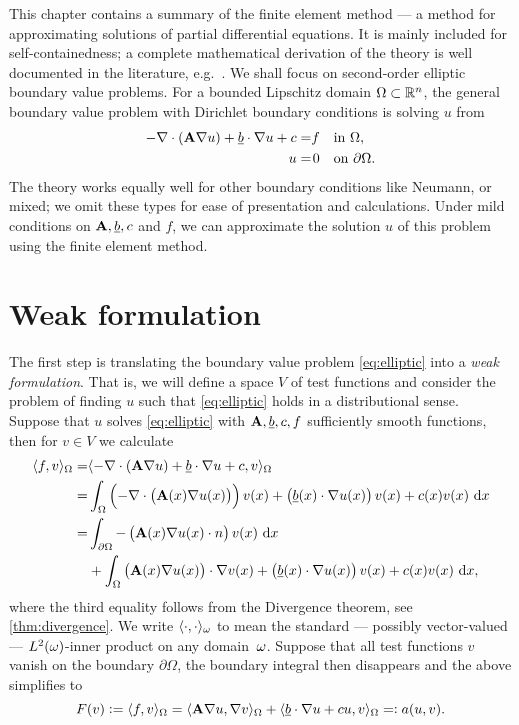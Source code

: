 \documentclass[thesis.tex]{subfiles}
\begin{document}
This chapter contains a summary of the finite element method ---
a method for approximating solutions of partial differential equations.
It is mainly included for self-containedness;
a complete mathematical derivation of the theory is well documented in the literature, e.g.~\cite{brenner, zienkiewicz1977finite}.
We shall focus on second-order elliptic boundary value problems. For a bounded Lipschitz domain $\Omega \subset \mathbb{R}^n$, the 
general boundary value problem with Dirichlet boundary conditions is solving $u$ from
\begin{equation}
  \label{eq:elliptic}
  \begin{alignedat}{2}
    -\nabla \cdot {\left(\mathbf{A} \nabla u\right)} + \underline{b} \cdot \nabla u + c &= &f \quad  &\text {in } \Omega,  \\
  u  &=& 0 \quad &\text{on } \partial\Omega.
  \end{alignedat}
\end{equation}
The theory works equally well for other boundary conditions like Neumann, or mixed; we omit
these types for ease of presentation and calculations. Under mild conditions on $\mathbf{A},\underline{b}, c$ 
and $f$, we can approximate the solution $u$ of this problem using the finite element method.

\section{Weak formulation}
The first step is translating the boundary value problem \eqref{eq:elliptic} into a \emph{weak formulation}.  
That is, we will define a space $V$ of test functions and consider the problem of finding $u$ such that \eqref{eq:elliptic} holds 
in a distributional sense. Suppose that $u$ solves \eqref{eq:elliptic} with $\mathbf{A}, \underline{b}, c, f$ sufficiently smooth functions, then for  $v \in V$  we calculate
\begin{align*}
  \ip{f,v}_{\O} = &\ip{-\nabla \cdot {\left(\mathbf{A} \nabla u\right)} + \v{b} \cdot \nabla u + c, v}_{\O} \\
  = &\int_\Omega \left( -\nabla \cdot {\left(\mathbf{A}(x) \nabla u(x)\right)}\right)v(x) + \left(\v{b}(x) \cdot \nabla u(x)\right)v(x) + c(x) v(x) \, \dif x\\
  = &\int_{\partial \Omega} -\left(\mathbf{A}(x) \nabla u(x) \cdot n\right)v(x) \, \dif x \\
  &+ \int_{\Omega} \left( \mathbf{A}(x) \nabla u(x)\right) \cdot \nabla v(x) + \left(\v{b}(x) \cdot \nabla u(x)\right)v(x) + c(x) v(x) \, \dif x,
\end{align*}
where the third equality follows from the Divergence theorem, see \ref{thm:divergence}. We write $\langle \cdot, \cdot \rangle_{\omega}$ to mean
the standard --- possibly vector-valued --- $L^2(\omega)$-inner product on any domain~$\omega$. Suppose that all test functions $v$ vanish on the boundary $\partial \Omega$, the boundary integral then disappears and the above simplifies to
\begin{equation}
  \label{eq:ellipticweak}
  F(v) := \langle f,v \rangle_\Omega = \langle \mathbf{A} \nabla u, \nabla v \rangle_\Omega + \langle \underline{b} \cdot \nabla u + cu, v \rangle_\Omega=: a(u,v).
\end{equation}
\end{document}
